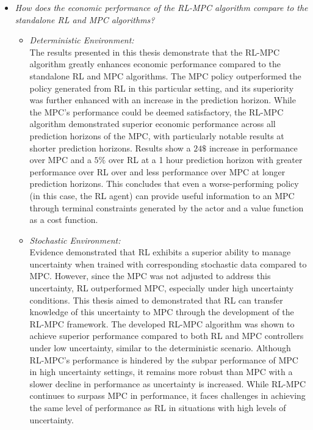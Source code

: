 \begin{itemize}[itemsep=7pt] %
	\item \textit{How does the economic performance of the RL-MPC algorithm compare to the standalone RL and MPC algorithms?} 
	
	\begin{itemize}
		\item \textit{Deterministic Environment:} 
		\\The results presented in this thesis demonstrate that the RL-MPC algorithm greatly enhances economic performance compared to the standalone RL and MPC algorithms. The MPC policy outperformed the policy generated from RL in this particular setting, and its superiority was further enhanced with an increase in the prediction horizon. While the MPC's performance could be deemed satisfactory, the RL-MPC algorithm demonstrated superior economic performance across all prediction horizons of the MPC, with particularly notable results at shorter prediction horizons. Results show a $24\$$ increase in performance over MPC and a $5\%$ over RL at a 1 hour prediction horizon with greater performance over RL over and less performance over MPC at longer prediction horizons. This concludes that even a worse-performing policy (in this case, the RL agent) can provide useful information to an MPC through terminal constraints generated by the actor and a value function as a cost function.
		
		\item \textit{Stochastic Environment:} 
		\\	
		Evidence demonstrated that RL exhibits a superior ability to manage uncertainty when trained with corresponding stochastic data compared to MPC. However, since the MPC was not adjusted to address this uncertainty, RL outperformed MPC, especially under high uncertainty conditions. This thesis aimed to demonstrated that RL can transfer knowledge of this uncertainty to MPC through the development of the RL-MPC framework. The developed RL-MPC algorithm was shown to achieve superior performance compared to both RL and MPC controllers under low uncertainty, similar to the deterministic scenario. Although RL-MPC's performance is hindered by the subpar performance of MPC in high uncertainty settings, it remains more robust than MPC with a slower decline in performance as uncertainty is increased. While RL-MPC continues to surpass MPC in performance, it faces challenges in achieving the same level of performance as RL in situations with high levels of uncertainty.
	\end{itemize}
	
\end{itemize}


